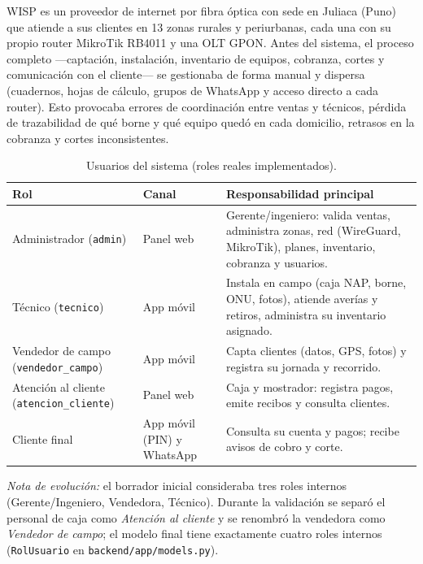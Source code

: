 WISP es un proveedor de internet por fibra óptica con sede en Juliaca (Puno) que
atiende a sus clientes en 13 zonas rurales y periurbanas, cada una con su propio
router MikroTik RB4011 y una OLT GPON. Antes del sistema, el proceso completo
—captación, instalación, inventario de equipos, cobranza, cortes y comunicación con
el cliente— se gestionaba de forma manual y dispersa (cuadernos, hojas de cálculo,
grupos de WhatsApp y acceso directo a cada router). Esto provocaba errores de
coordinación entre ventas y técnicos, pérdida de trazabilidad de qué borne y qué
equipo quedó en cada domicilio, retrasos en la cobranza y cortes inconsistentes.

\begin{table}[htbp]
\centering
\caption{Usuarios del sistema (roles reales implementados).}
\label{tab:ce02-roles}
\small
\begin{tabularx}{\textwidth}{L{3.2cm}L{3cm}X}
\toprule
\textbf{Rol} & \textbf{Canal} & \textbf{Responsabilidad principal} \\
\midrule
Administrador (\texttt{admin}) & Panel web & Gerente/ingeniero: valida ventas, administra zonas, red (WireGuard, MikroTik), planes, inventario, cobranza y usuarios. \\
Técnico (\texttt{tecnico}) & App móvil & Instala en campo (caja NAP, borne, ONU, fotos), atiende averías y retiros, administra su inventario asignado. \\
Vendedor de campo (\texttt{vendedor\_campo}) & App móvil & Capta clientes (datos, GPS, fotos) y registra su jornada y recorrido. \\
Atención al cliente (\texttt{atencion\_cliente}) & Panel web & Caja y mostrador: registra pagos, emite recibos y consulta clientes. \\
Cliente final & App móvil (PIN) y WhatsApp & Consulta su cuenta y pagos; recibe avisos de cobro y corte. \\
\bottomrule
\end{tabularx}
\end{table}

\noindent\textit{Nota de evolución:} el borrador inicial consideraba tres roles
internos (Gerente/Ingeniero, Vendedora, Técnico). Durante la validación se separó el
personal de caja como \emph{Atención al cliente} y se renombró la vendedora como
\emph{Vendedor de campo}; el modelo final tiene exactamente cuatro roles internos
(\texttt{RolUsuario} en \texttt{backend/app/models.py}).

